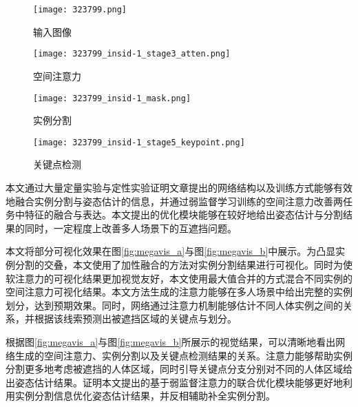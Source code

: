 \begin{figure*}[hbtp]
\begin{minipage}[t]{\linewidth}
		\vskip5pt
		\begin{subfigure}[b]{0.23\linewidth}
			\texttt{[image: 323799.png]}
			\caption{输入图像}
		\end{subfigure}
		\begin{subfigure}[b]{0.23\linewidth}
			\texttt{[image: 323799\_insid-1\_stage3\_atten.png]}
			\caption{空间注意力}
		\end{subfigure}
		\begin{subfigure}[b]{0.23\linewidth}
			\texttt{[image: 323799\_insid-1\_mask.png]}
			\caption{实例分割}
		\end{subfigure}
		\begin{subfigure}[b]{0.23\linewidth}
			\texttt{[image: 323799\_insid-1\_stage5\_keypoint.png]}
			\caption{关键点检测}
		\end{subfigure}
	\end{minipage}
	\caption{本文方法得到的视觉效果图-第2组}
	\label{fig:megavis_b}
\end{figure*}

本文通过大量定量实验与定性实验证明文章提出的网络结构以及训练方式能够有效地融合实例分割与姿态估计的信息，并通过弱监督学习训练的空间注意力改善两任务中特征的融合与表达。本文提出的优化模块能够在较好地给出姿态估计与分割结果的同时，一定程度上改善多人场景下的互遮挡问题。

本文将部分可视化效果在图\ref{fig:megavis_a}与图\ref{fig:megavis_b}中展示。为凸显实例分割的交叠，本文使用了加性融合的方法对实例分割结果进行可视化。同时为使软注意力的可视化结果更加视觉友好，本文使用最大值合并的方式混合不同实例的空间注意力可视化结果。本文方法生成的注意力能够在多人场景中给出完整的实例划分，达到预期效果。同时，网络通过注意力机制能够估计不同人体实例之间的关系，并根据该线索预测出被遮挡区域的关键点与划分。

根据图\ref{fig:megavis_a}与图\ref{fig:megavis_b}所展示的视觉结果，可以清晰地看出网络生成的空间注意力、实例分割以及关键点检测结果的关系。注意力能够帮助实例分割更多地考虑被遮挡的人体区域，同时引导关键点分支分别对不同的人体区域给出姿态估计结果。证明本文提出的基于弱监督注意力的联合优化模块能够更好地利用实例分割信息优化姿态估计结果，并反相辅助补全实例分割。


